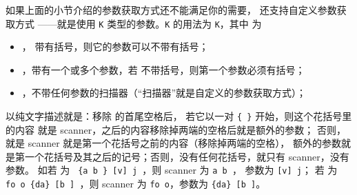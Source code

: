 \documentclass[openany]{book}
\begin{document}
如果上面的小节介绍的参数获取方式还不能满足你的需要， 还支持自定义参数获取方式
——就是使用 \texttt K 类型的参数。\texttt K 的用法为 \verb|K|，其中
 为
\begin{itemize}
  \item {}， 带有括号，则它的参数可以不带有括号；
  \item {}，带有一个或多个参数，若  不带括号，则第一个参数必须有括号；
  \item {}，不带任何参数的扫描器（“扫描器”就是自定义的参数获取方式）；
\end{itemize}
以纯文字描述就是：移除  的首尾空格后，
若它以一对 \verb|{ }| 开始，则这个花括号里的内容
就是 scanner，之后的内容移除掉两端的空格后就是额外的参数；
否则，就是 scanner 就是第一个花括号之前的内容（移除掉两端的空格），
额外的参数就是第一个花括号及其之后的记号；否则，没有任何花括号，就只有 scanner，没有参数。
如若  为 \verb*| {a b } [v] j |，则 scanner 为 \verb*|a b |，
参数为 \verb*|[v] j|；
若  为 \verb*| fo o {da} [b ] |，则 scanner 为 
\verb*|fo o|，参数为 \verb*|{da} [b ]|。
\end{document}
